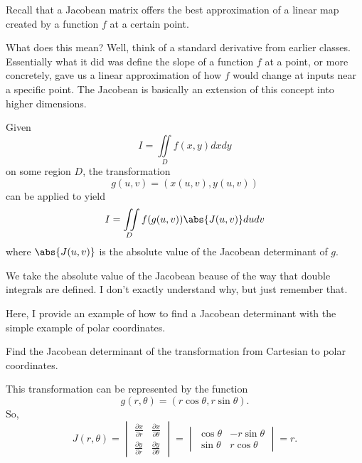 \begin{remark}
    Recall that a Jacobean matrix offers the best approximation of a linear map created by a function $f$ at a certain point.
\end{remark}

What does this mean? Well, think of a standard derivative from earlier classes. Essentially what it did was define the slope of a function $f$ at a point, or more concretely, gave us a linear approximation of how $f$ would change at inputs near a specific point. The Jacobean is basically an extension of this concept into higher dimensions. 

\begin{definition}
    Given
    \[I = \iint\limits_{D}f(x, y)dxdy\]
    on some region $D$, the transformation
    \[g(u, v) = (x(u, v), y(u, v))\]
    can be applied to yield
    \[I = \iint\limits_{D}f(g(u, v))\abs{J(u, v)}dudv\]
    where $\abs{J(u, v)}$ is the absolute value of the Jacobean determinant of $g$.
\end{definition}

\begin{remark}
    We take the absolute value of the Jacobean beause of the way that double integrals are defined. I don't exactly understand why, but just remember that.
\end{remark}

Here, I provide an example of how to find a Jacobean determinant with the simple example of polar coordinates.

\begin{example}
    Find the Jacobean determinant of the transformation from Cartesian to polar coordinates.

    \begin{soln}
        This transformation can be represented by the function
        \[g(r, \theta) = (r\cos\theta, r\sin\theta).\]
        So,
        \[J(r, \theta) = \begin{vmatrix}
            \frac{\partial x}{\partial r} & \frac{\partial x}{\partial \theta} \\
            \frac{\partial y}{\partial r} & \frac{\partial y}{\partial \theta}
        \end{vmatrix} = \begin{vmatrix}
            \cos\theta & -r\sin\theta \\
            \sin\theta & r\cos\theta
        \end{vmatrix} = r.\]
    \end{soln}
\end{example}

